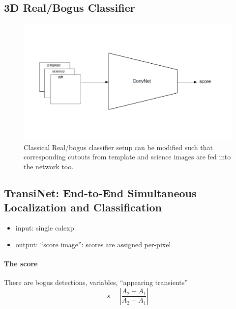 \subsection{3D Real/Bogus Classifier}
\begin{figure}[h]
  \centering
  \includegraphics[width=.8\textwidth]{material/rb-classifier-mod}
  \caption{Classical Real/bogus classifier setup can be modified such that corresponding cutouts from template and science images are fed into the network too.}
  \label{fig:rbdiagram}
\end{figure}


\subsection{TransiNet: End-to-End Simultaneous Localization and Classification}

\begin{itemize}
  \item input: single calexp
  \item output: ``score image'': scores are assigned per-pixel
\end{itemize}


\paragraph{The score}
There are bogus detections, variables, ``appearing transients''
\begin{equation}
  s=\left| \frac{A_2-A_1}{A_2+A_1} \right|
\end{equation}







